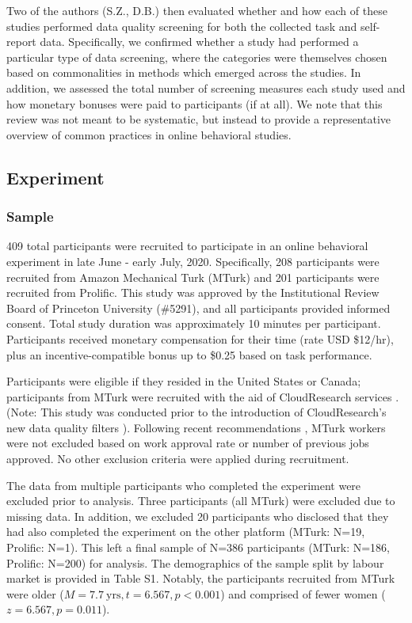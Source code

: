 \documentclass[a4paper,notitlepage,12pt]{article}
\begin{document}
\begin{refsection}[main]
Two of the authors (S.Z., D.B.) then evaluated whether and how each of these studies performed data quality screening for both the collected task and self-report data. Specifically, we confirmed whether a study had performed a particular type of data screening, where the categories were themselves chosen based on commonalities in methods which emerged across the studies. In addition, we assessed the total number of screening measures each study used and how monetary bonuses were paid to participants (if at all). We note that this review was not meant to be systematic, but instead to provide a representative overview of common practices in online behavioral studies.

\subsection{Experiment}

\subsubsection{Sample}

409 total participants were recruited to participate in an online behavioral experiment in late June - early July, 2020. Specifically, 208 participants were recruited from Amazon Mechanical Turk (MTurk) and 201 participants were recruited from Prolific. This study was approved by the Institutional Review Board of Princeton University (\#5291), and all participants provided informed consent. Total study duration was approximately 10 minutes per participant. Participants received monetary compensation for their time (rate USD \$12/hr), plus an incentive-compatible bonus up to \$0.25 based on task performance. 

Participants were eligible if they resided in the United States or Canada; participants from MTurk were recruited with the aid of CloudResearch services \cite{litman2017turkprime}. (Note: This study was conducted prior to the introduction of CloudResearch's new data quality filters \cite{cloudresearch_2020}). Following recent recommendations \cite{robinson2019tapped}, MTurk workers were not excluded based on work approval rate or number of previous jobs approved. No other exclusion criteria were applied during recruitment. 

The data from multiple participants who completed the experiment were excluded prior to analysis. Three participants (all MTurk) were excluded due to missing data. In addition, we excluded 20 participants who disclosed that they had also completed the experiment on the other platform (MTurk: N=19, Prolific: N=1). This left a final sample of N=386 participants (MTurk: N=186, Prolific: N=200) for analysis. The demographics of the sample split by labour market is provided in Table S1. Notably, the participants recruited from MTurk were older ($M = 7.7 \ \text{yrs}, t = 6.567, p < 0.001$) and comprised of fewer women ($z = 6.567, p = 0.011$). 


\end{refsection}
\end{document}
